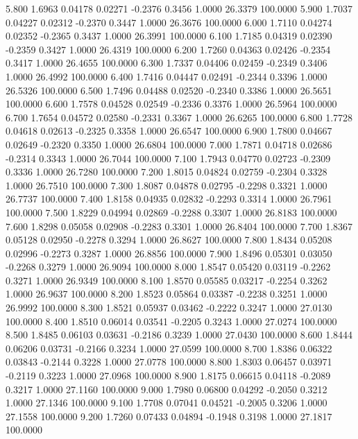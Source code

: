   5.800   1.6963   0.04178   0.02271  -0.2376   0.3456   1.0000  26.3379 100.0000
   5.900   1.7037   0.04227   0.02312  -0.2370   0.3447   1.0000  26.3676 100.0000
   6.000   1.7110   0.04274   0.02352  -0.2365   0.3437   1.0000  26.3991 100.0000
   6.100   1.7185   0.04319   0.02390  -0.2359   0.3427   1.0000  26.4319 100.0000
   6.200   1.7260   0.04363   0.02426  -0.2354   0.3417   1.0000  26.4655 100.0000
   6.300   1.7337   0.04406   0.02459  -0.2349   0.3406   1.0000  26.4992 100.0000
   6.400   1.7416   0.04447   0.02491  -0.2344   0.3396   1.0000  26.5326 100.0000
   6.500   1.7496   0.04488   0.02520  -0.2340   0.3386   1.0000  26.5651 100.0000
   6.600   1.7578   0.04528   0.02549  -0.2336   0.3376   1.0000  26.5964 100.0000
   6.700   1.7654   0.04572   0.02580  -0.2331   0.3367   1.0000  26.6265 100.0000
   6.800   1.7728   0.04618   0.02613  -0.2325   0.3358   1.0000  26.6547 100.0000
   6.900   1.7800   0.04667   0.02649  -0.2320   0.3350   1.0000  26.6804 100.0000
   7.000   1.7871   0.04718   0.02686  -0.2314   0.3343   1.0000  26.7044 100.0000
   7.100   1.7943   0.04770   0.02723  -0.2309   0.3336   1.0000  26.7280 100.0000
   7.200   1.8015   0.04824   0.02759  -0.2304   0.3328   1.0000  26.7510 100.0000
   7.300   1.8087   0.04878   0.02795  -0.2298   0.3321   1.0000  26.7737 100.0000
   7.400   1.8158   0.04935   0.02832  -0.2293   0.3314   1.0000  26.7961 100.0000
   7.500   1.8229   0.04994   0.02869  -0.2288   0.3307   1.0000  26.8183 100.0000
   7.600   1.8298   0.05058   0.02908  -0.2283   0.3301   1.0000  26.8404 100.0000
   7.700   1.8367   0.05128   0.02950  -0.2278   0.3294   1.0000  26.8627 100.0000
   7.800   1.8434   0.05208   0.02996  -0.2273   0.3287   1.0000  26.8856 100.0000
   7.900   1.8496   0.05301   0.03050  -0.2268   0.3279   1.0000  26.9094 100.0000
   8.000   1.8547   0.05420   0.03119  -0.2262   0.3271   1.0000  26.9349 100.0000
   8.100   1.8570   0.05585   0.03217  -0.2254   0.3262   1.0000  26.9637 100.0000
   8.200   1.8523   0.05864   0.03387  -0.2238   0.3251   1.0000  26.9992 100.0000
   8.300   1.8521   0.05937   0.03462  -0.2222   0.3247   1.0000  27.0130 100.0000
   8.400   1.8510   0.06014   0.03541  -0.2205   0.3243   1.0000  27.0274 100.0000
   8.500   1.8485   0.06103   0.03631  -0.2186   0.3239   1.0000  27.0430 100.0000
   8.600   1.8444   0.06206   0.03731  -0.2166   0.3234   1.0000  27.0599 100.0000
   8.700   1.8386   0.06322   0.03843  -0.2144   0.3228   1.0000  27.0778 100.0000
   8.800   1.8303   0.06457   0.03971  -0.2119   0.3223   1.0000  27.0968 100.0000
   8.900   1.8175   0.06615   0.04118  -0.2089   0.3217   1.0000  27.1160 100.0000
   9.000   1.7980   0.06800   0.04292  -0.2050   0.3212   1.0000  27.1346 100.0000
   9.100   1.7708   0.07041   0.04521  -0.2005   0.3206   1.0000  27.1558 100.0000
   9.200   1.7260   0.07433   0.04894  -0.1948   0.3198   1.0000  27.1817 100.0000
